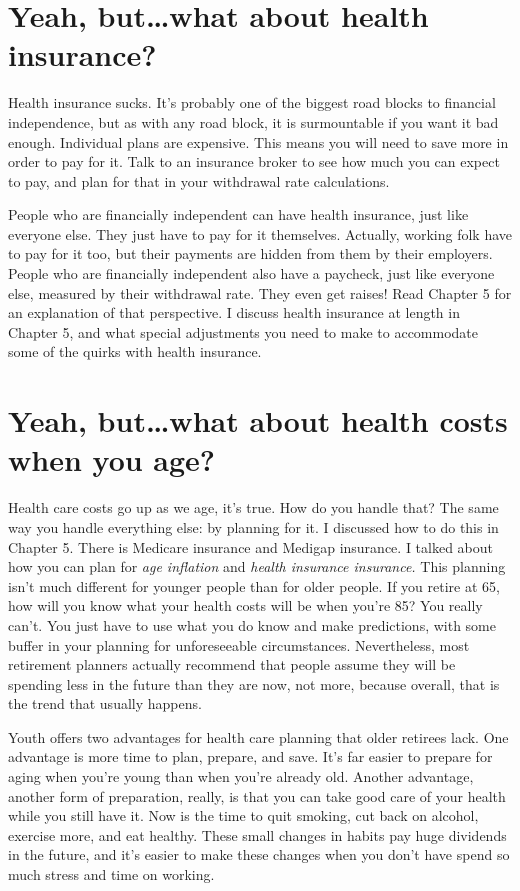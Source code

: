 \section{Yeah, but\ldots what about health insurance?}
Health insurance sucks. It's probably one of the biggest road blocks to financial independence, but as with any road block, it is surmountable if you want it bad enough. Individual plans are expensive. This means you will need to save more in order to pay for it. Talk to an insurance broker to see how much you can expect to pay, and plan for that in your withdrawal rate calculations.

People who are financially independent can have health insurance, just like everyone else. They just have to pay for it themselves. Actually, working folk have to pay for it too, but their payments are hidden from them by their employers. People who are financially independent also have a paycheck, just like everyone else, measured by their withdrawal rate. They even get raises! Read Chapter 5 for an explanation of that perspective. I discuss health insurance at length in Chapter 5, and what special adjustments you need to make to accommodate some of the quirks with health insurance.

\section{Yeah, but\ldots what about health costs when you age?}
Health care costs go up as we age, it's true. How do you handle that? The same way you handle everything else: by planning for it. I discussed how to do this in Chapter 5. There is Medicare insurance and Medigap insurance. I talked about how you can plan for \emph{age inflation} and \emph{health insurance insurance.} This planning isn't much different for younger people than for older people. If you retire at 65, how will you know what your health costs will be when you're 85? You really can't. You just have to use what you do know and make predictions, with some buffer in your planning for unforeseeable circumstances. Nevertheless, most retirement planners actually recommend that people assume they will be spending less in the future than they are now, not more, because overall, that is the trend that usually happens.

Youth offers two advantages for health care planning that older retirees lack. One advantage is more time to plan, prepare, and save. It's far easier to prepare for aging when you're young than when you're already old. Another advantage, another form of preparation, really, is that you can take good care of your health while you still have it. Now is the time to quit smoking, cut back on alcohol, exercise more, and eat healthy. These small changes in habits pay huge dividends in the future, and it's easier to make these changes when you don't have spend so much stress and time on working.

